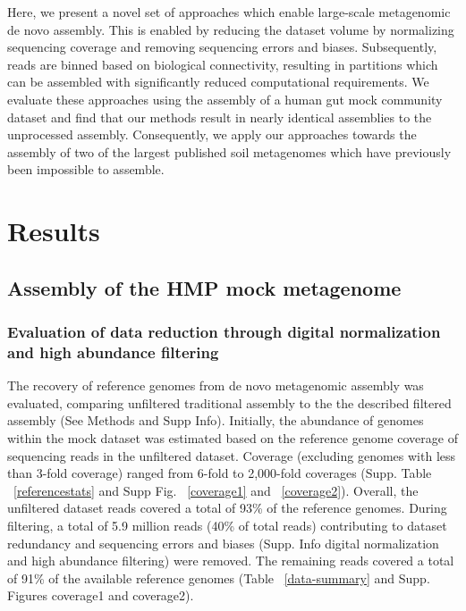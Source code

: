 \documentclass[11pt]{article} %
\begin{document}
Here, we present a novel set of approaches which enable large-scale metagenomic de novo assembly.  This is enabled by reducing the dataset volume by normalizing sequencing coverage and removing sequencing errors and biases.  Subsequently, reads are binned based on biological connectivity, resulting in partitions which can be assembled with significantly reduced computational requirements.   We evaluate these approaches using the assembly of a human gut mock community dataset and find that our methods result in nearly identical assemblies to the unprocessed assembly.  Consequently, we apply our approaches towards the assembly of two of the largest published soil metagenomes which have previously been impossible to assemble. 

\section{Results}

\subsection{Assembly of the HMP mock metagenome}

\subsubsection{Evaluation of data reduction through digital normalization and high abundance filtering}

The recovery of reference genomes from de novo metagenomic assembly was evaluated, comparing unfiltered traditional assembly to the the described filtered assembly (See Methods and Supp Info). Initially, the abundance of genomes within the mock dataset was estimated based on the reference genome coverage of sequencing reads in the unfiltered dataset.  Coverage (excluding genomes with less than 3-fold coverage) ranged from 6-fold to 2,000-fold coverages (Supp. Table ~\ref{referencestats} and Supp Fig. ~\ref{coverage1} and ~\ref{coverage2}).  Overall, the unfiltered dataset reads covered a total of 93\% of the reference genomes.  During filtering, a total of 5.9 million reads (40\% of total reads) contributing to dataset redundancy and sequencing errors and biases (Supp. Info digital normalization and high abundance filtering) were removed.  The remaining reads covered a total of 91\% of the available reference genomes (Table ~\ref{data-summary} and Supp. Figures coverage1 and coverage2).   
\end{document}
